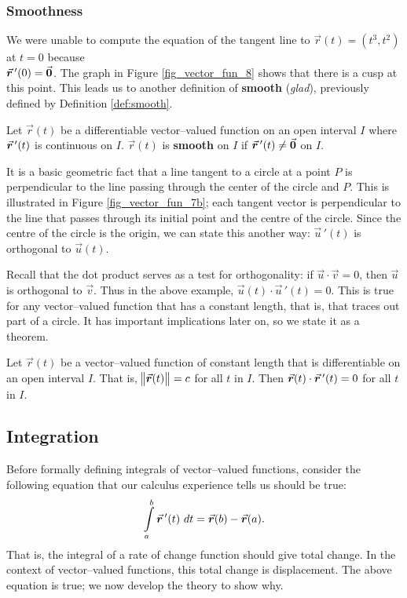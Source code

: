 \subsubsection{Smoothness}

We were unable to compute the equation of the tangent line to $\vec r(t)= \left( t^3,t^2\right)$ at $t=0$ because \\ $\vrp(0) = \vec 0$. The graph in Figure \ref{fig_vector_fun_8} shows that there is a cusp at this point. This leads us to another definition of \textbf{smooth} (\textit{glad}), previously defined by Definition \ref{def:smooth}.

\begin{definition}\label{def:vector_smooth}
Let $\vec r(t)$ be a differentiable vector--valued function on an open interval $I$ where $\vrp(t)$ is continuous on $I$. $\vec r(t)$ is \textbf{smooth} on $I$ if $\vrp(t)\neq \vec 0$ on $I$.
\end{definition}


It is a basic geometric fact that a line tangent to a circle at a point $P$ is perpendicular to the line passing through the center of the circle and $P$. This is illustrated in Figure \ref{fig_vector_fun_7b}; each tangent vector is perpendicular to the line that passes through its initial point and the centre of the circle. Since the centre of the circle is the origin, we can state this another way: $\vec u\,'(t)$ is orthogonal to $\vec u(t)$.

Recall that the dot product serves as a test for orthogonality: if $\vec u\cdot \vec v = 0$, then $\vec u$ is orthogonal to $\vec v$. Thus in the above example, $\vec u(t)\cdot \vec u\,'(t)=0$. This is true for any vector--valued function that has a constant length, that is, that traces out part of a circle. It has important implications later on, so we state it as a theorem.

\begin{theorem}\label{thm:vects_of_constant_length}
Let $\vec r(t)$ be a  vector--valued function of constant length that is differentiable on an open interval $I$. That is, $\norm{\vec r(t)} = c$ for all $t$ in $I$. Then $\vec r(t)\cdot\vrp(t) = 0$ for all $t$ in $I$.
\end{theorem}

\subsection{Integration}
Before formally defining integrals of vector--valued functions, consider the following equation that our calculus experience tells us should be true:
$$\int\limits_a^b \vrp(t)\ dt = \vec r(b) - \vec r(a).$$
That is, the integral of a rate of change function should give total change. In the context of vector--valued functions, this total change is displacement. The above equation is true; we now develop the theory to show why.


